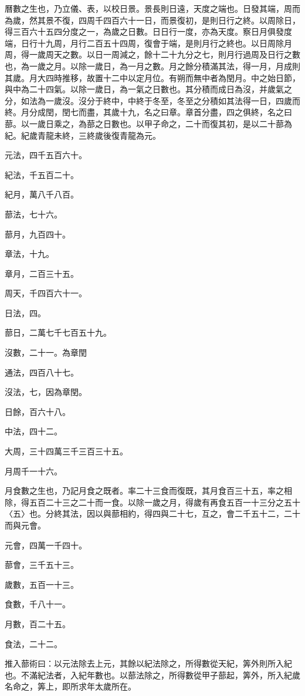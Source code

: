 \begin{pinyinscope}
曆數之生也，乃立儀、表，以校日景。景長則日遠，天度之端也。日發其端，周而為歲，然其景不復，四周千四百六十一日，而景復初，是則日行之終。以周除日，得三百六十五四分度之一，為歲之日數。日日行一度，亦為天度。察日月俱發度端，日行十九周，月行二百五十四周，復會于端，是則月行之終也。以日周除月周，得一歲周天之數。以日一周減之，餘十二十九分之七，則月行過周及日行之數也，為一歲之月。以除一歲日，為一月之數。月之餘分積滿其法，得一月，月成則其歲。月大四時推移，故置十二中以定月位。有朔而無中者為閏月。中之始日節，與中為二十四氣。以除一歲日，為一氣之日數也。其分積而成日為沒，并歲氣之分，如法為一歲沒。沒分于終中，中終于冬至，冬至之分積如其法得一日，四歲而終。月分成閏，閏七而盡，其歲十九，名之曰章。章首分盡，四之俱終，名之曰蔀。以一歲日乘之，為蔀之日數也。以甲子命之，二十而復其初，是以二十蔀為紀。紀歲青龍未終，三終歲後復青龍為元。

元法，四千五百六十。

紀法，千五百二十。

紀月，萬八千八百。

蔀法，七十六。

蔀月，九百四十。

章法，十九。

章月，二百三十五。

周天，千四百六十一。

日法，四。

蔀日，二萬七千七百五十九。

沒數，二十一。為章閏

通法，四百八十七。

沒法，七，因為章閏。

日餘，百六十八。

中法，四十二。

大周，三十四萬三千三百三十五。

月周千一十六。

月食數之生也，乃記月食之既者。率二十三食而復既，其月食百三十五，率之相除，得五百二十三之二十而一食。以除一歲之月，得歲有再食五百一十三分之五十〈五〉也。分終其法，因以與蔀相約，得四與二十七，互之，會二千五十二，二十而與元會。

元會，四萬一千四十。

蔀會，三千五十三。

歲數，五百一十三。

食數，千八十一。

月數，百二十五。

食法，二十二。

推入蔀術曰：以元法除去上元，其餘以紀法除之，所得數從天紀，筭外則所入紀也。不滿紀法者，入紀年數也。以蔀法除之，所得數從甲子蔀起，筭外，所入紀歲名命之，筭上，即所求年太歲所在。


\end{pinyinscope}
